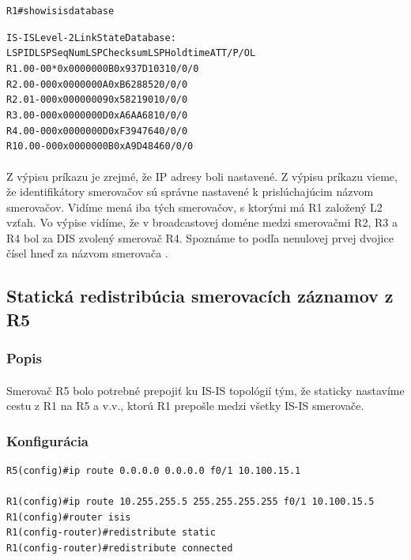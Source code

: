 \documentclass[12pt,twoside,a4paper]{report}
\begin{document}
\noindent
{\selectfont
\begin{small}
\begin{alltt}
R1#show isis database

IS-IS Level-2 Link State Database:
LSPID                 LSP Seq Num  LSP Checksum  LSP Holdtime      ATT/P/OL
R1.00-00            * 0x0000000B   0x937D        1031              0/0/0
R2.00-00              0x0000000A   0xB628        852               0/0/0
R2.01-00              0x00000009   0x5821        901               0/0/0
R3.00-00              0x0000000D   0xA6AA        681               0/0/0
R4.00-00              0x0000000D   0xF394        764               0/0/0
R10.00-00             0x0000000B   0xA9D4        846               0/0/0
\end{alltt}
\end{small}
}

\paragraph{}
Z výpisu príkazu  je zrejmé, že IP adresy boli nastavené. Z výpisu príkazu  vieme, že identifikátory smerovačov sú správne nastavené k prislúchajúcim názvom smerovačov. Vidíme mená iba tých smerovačov, s ktorými má R1 založený L2 vzťah. Vo výpise  vidíme, že v broadcastovej doméne medzi smerovačmi R2, R3 a R4 bol za DIS zvolený smerovač R4. Spoznáme to podľa nenulovej prvej dvojice čísel hneď za názvom smerovača .



\subsection{Statická redistribúcia smerovacích záznamov z R5}
\subsubsection{Popis}
\paragraph{}
Smerovač R5 bolo potrebné prepojiť ku IS-IS topológií tým, že staticky nastavíme cestu z R1 na R5 a v.v., ktorú R1 prepošle medzi všetky IS-IS smerovače.

\subsubsection{Konfigurácia}
\noindent
{\selectfont
\begin{small}
\begin{verbatim}
R5(config)#ip route 0.0.0.0 0.0.0.0 f0/1 10.100.15.1

R1(config)#ip route 10.255.255.5 255.255.255.255 f0/1 10.100.15.5
R1(config)#router isis
R1(config-router)#redistribute static
R1(config-router)#redistribute connected
\end{verbatim}
\end{small}
}
\end{document}

